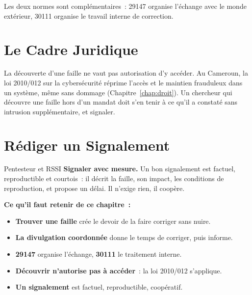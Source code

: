 Les deux normes sont complémentaires~: 29147 organise l'échange avec le
monde extérieur, 30111 organise le travail interne de correction.

\section{Le Cadre Juridique}
\label{sec:c24-droit}

\begin{boxjuris}
La découverte d'une faille ne vaut pas autorisation d'y accéder. Au
Cameroun, la loi 2010/012 sur la cybersécurité réprime l'accès et le
maintien frauduleux dans un système, même sans dommage
(Chapitre~\ref{chap:droit}). Un chercheur qui découvre une faille hors d'un
mandat doit s'en tenir à ce qu'il a constaté sans intrusion supplémentaire,
et signaler.
\end{boxjuris}

\section{Rédiger un Signalement}
\label{sec:c24-signalement}

\begin{boxmetier}{Pentesteur et RSSI}
\textbf{Signaler avec mesure.} Un bon signalement est factuel, reproductible
et courtois~: il décrit la faille, son impact, les conditions de
reproduction, et propose un délai. Il n'exige rien, il coopère.
\end{boxmetier}

\separateur

\begin{boxresume}
\textbf{Ce qu'il faut retenir de ce chapitre~:}
\begin{itemize}
    \item \textbf{Trouver une faille} crée le devoir de la faire corriger
          sans nuire.
    \item \textbf{La divulgation coordonnée} donne le temps de corriger, puis
          informe.
    \item \textbf{29147} organise l'échange, \textbf{30111} le traitement
          interne.
    \item \textbf{Découvrir n'autorise pas à accéder}~: la loi 2010/012
          s'applique.
    \item \textbf{Un signalement} est factuel, reproductible, coopératif.
\end{itemize}
\end{boxresume}

